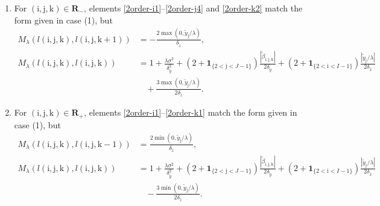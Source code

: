 \documentclass[12pt]{article}
\numberwithin{equation}{section}
\newcommand{\indic}{\mathbf{1}}
\newcommand{\ri}{\mathrm{i}}
\newcommand{\rj}{\mathrm{j}}
\newcommand{\rk}{\mathrm{k}}
\begin{document}
\begin{enumerate}[label = (\arabic*)]
\begin{align}
		M_{\lambda}(l(\ri,\rj,\rk), l(\ri,\rj,\rk -1)) 
		&= (1 + \indic_{\{2< \rk < K-1\}})\frac{ \min(0,\tilde{y}_{\rj}/\lambda)}{\delta_{\tilde{z}}}, \label{2order-k3}\\
	    M_{\lambda}(l(\ri,\rj,\rk), l(\ri,\rj,\rk + 1)) 
		&= -(1 + \indic_{\{2< \rk < K-1\}})\frac{ \max(0,\tilde{y}_{\rj}/\lambda)}{\delta_{\tilde{z}}}, \label{2order-k4}\\
		M_{\lambda}(l(\ri,\rj,\rk), l(\ri,\rj,\rk)) 
		&= 1 + \frac{\lambda\sigma^{2}}{\delta_{\tilde{y}}^{2}} 
		+ (2 +\indic_{\{2< \rj < J-1\}})\frac{|\tilde{\beta}_{\ri,\rj,\rk}|}{2\delta_{\tilde{y}}}\\
		&~~~~+ (2 +\indic_{\{2< \ri < I-1\}})\frac{|\tilde{y}_{\rj}/\lambda|}{2\delta_{\tilde{x}}} 
		+ (2 +\indic_{\{2< \rk < K-1\}})\frac{|\tilde{y}_{\rj}/\lambda|}{2\delta_{\tilde{z}}}. \notag
	\end{align}
	\item  For $(\ri,\rj,\rk) \in \bm{R}_{-}$, 
	elements \eqref{2order-i1}--\eqref{2order-j4} and \eqref{2order-k2} match the form given in case (1), 
	but 
	\begin{align*}
		M_{\lambda}(l(\ri,\rj,\rk), l(\ri,\rj,\rk+1)) 
		&= -\frac{2\max(0, \tilde{y}_{\rj}/\lambda)}{\delta_{\tilde{z}}}, \\
		M_{\lambda}(l(\ri,\rj,\rk), l(\ri,\rj,\rk)) 
		&= 1 + \frac{\lambda\sigma^{2}}{\delta_{\tilde{y}}^{2}} 
		+ (2 +\indic_{\{2< \rj < J-1\}})\frac{|\tilde{\beta}_{\ri,\rj,\rk}|}{2\delta_{\tilde{y}}}
		+ (2 +\indic_{\{2< \ri < I-1\}})\frac{|\tilde{y}_{\rj}/\lambda|}{2\delta_{\tilde{x}}} \\
		&~~~~+ \frac{3\max(0, \tilde{y}_{\rj}/\lambda)}{2\delta_{\tilde{z}}}.
	\end{align*}
	\item For $(\ri,\rj,\rk) \in \bm{R}_{+}$, 
	elements \eqref{2order-i1}--\eqref{2order-k1} match the form given in case (1), 
	but 
	\begin{align*}
		M_{\lambda}(l(\ri,\rj,\rk), l(\ri,\rj,\rk-1)) 
		&= \frac{2\min(0, \tilde{y}_{\rj}/\lambda)}{\delta_{\tilde{z}}}, \\
		M_{\lambda}(l(\ri,\rj,\rk), l(\ri,\rj,\rk)) 
		&= 1 + \frac{\lambda\sigma^{2}}{\delta_{\tilde{y}}^{2}} 
		+ (2 +\indic_{\{2< \rj < J-1\}})\frac{|\tilde{\beta}_{\ri,\rj,\rk}|}{2\delta_{\tilde{y}}}
		+ (2 +\indic_{\{2< \ri < I-1\}})\frac{|\tilde{y}_{\rj}/\lambda|}{2\delta_{\tilde{x}}} \\
		&~~~~ - \frac{3\min(0, \tilde{y}_{\rj}/\lambda)}{2\delta_{\tilde{z}}}. 

\end{align*}
\end{enumerate}
\end{document}
